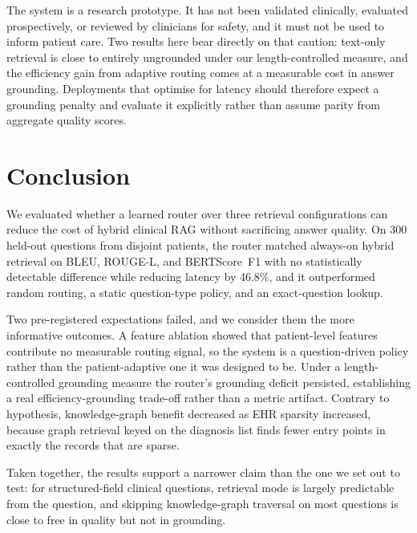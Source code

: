 \documentclass[conference]{IEEEtran}
\begin{document}
The system is a research prototype. It has not been validated
clinically, evaluated prospectively, or reviewed by clinicians for
safety, and it must not be used to inform patient care. Two results
here bear directly on that caution: text-only retrieval is close to
entirely ungrounded under our length-controlled measure, and the
efficiency gain from adaptive routing comes at a measurable cost in
answer grounding. Deployments that optimise for latency should
therefore expect a grounding penalty and evaluate it explicitly rather
than assume parity from aggregate quality scores.

\section{Conclusion}

We evaluated whether a learned router over three retrieval
configurations can reduce the cost of hybrid clinical RAG without
sacrificing answer quality. On 300 held-out questions from disjoint
patients, the router matched always-on hybrid retrieval on BLEU,
ROUGE-L, and BERTScore~F1 with no statistically detectable difference
while reducing latency by 46.8\%, and it outperformed random routing,
a static question-type policy, and an exact-question lookup.

Two pre-registered expectations failed, and we consider them the more
informative outcomes. A feature ablation showed that patient-level
features contribute no measurable routing signal, so the system is a
question-driven policy rather than the patient-adaptive one it was
designed to be. Under a length-controlled grounding measure the
router's grounding deficit persisted, establishing a real
efficiency-grounding trade-off rather than a metric artifact. Contrary
to hypothesis, knowledge-graph benefit decreased as EHR sparsity
increased, because graph retrieval keyed on the diagnosis list finds
fewer entry points in exactly the records that are sparse.

Taken together, the results support a narrower claim than the one we
set out to test: for structured-field clinical questions, retrieval
mode is largely predictable from the question, and skipping
knowledge-graph traversal on most questions is close to free in
quality but not in grounding.
\end{document}
